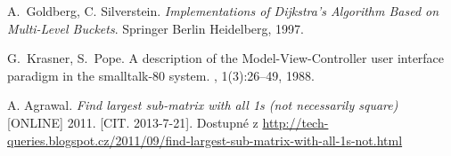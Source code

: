 \begin{thebibliography}{99}
A.~Goldberg, C. Silverstein.
\emph{Implementations of Dijkstra’s Algorithm Based on Multi-Level Buckets}.
Springer Berlin Heidelberg,
1997.

G.~Krasner, S.~Pope.
\newblock A description of the {Model-View-Controller} user interface paradigm
  in the smalltalk-80 system.
, 1(3):26--49, 1988.

A. Agrawal.
\emph{Find largest sub-matrix with all 1s (not necessarily square)} [ONLINE] 2011. [CIT. 2013-7-21]. Dostupné z
\url{http://tech-queries.blogspot.cz/2011/09/find-largest-sub-matrix-with-all-1s-not.html}





\end{thebibliography}
